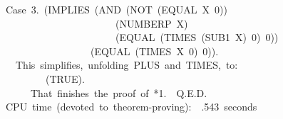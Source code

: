 \documentclass[11pt]{book}
\newenvironment{pubasis}{\begin{flushleft}\ttfamily\small}{\normalsize\rmfamily\end{flushleft}}
\begin{document}
\begin{pubasis}
Case~3.~(IMPLIES~(AND~(NOT~(EQUAL~X~0))\\
~~~~~~~~~~~~~~~~~~~~~~(NUMBERP~X)\\
~~~~~~~~~~~~~~~~~~~~~~(EQUAL~(TIMES~(SUB1~X)~0)~0))\\
~~~~~~~~~~~~~~~~~(EQUAL~(TIMES~X~0)~0)).\\

~~This~simplifies,~unfolding~PLUS~and~TIMES,~to:\\

~~~~~~~~(TRUE).\\

~~~~~That~finishes~the~proof~of~*1.~~Q.E.D.\\

CPU~time~(devoted~to~theorem-proving):~~.543~seconds\\
\end{pubasis}
\end{document}
